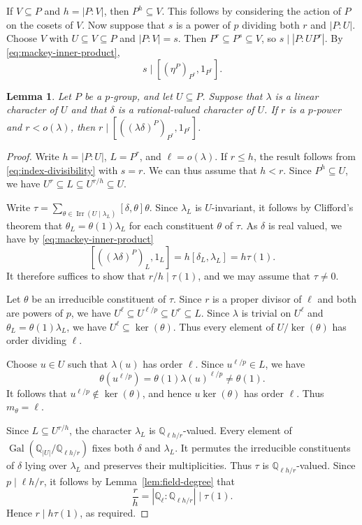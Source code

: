 \documentclass[reqno]{amsart}
\newtheorem{lem}[thm]{Lemma}
\theoremstyle{definition}
\theoremstyle{remark}
\numberwithin{equation}{section}
\DeclareMathOperator{\Irr}{Irr}
\DeclareMathOperator{\Gal}{Gal}
\theoremstyle{plain}
\begin{document}
If $V\subseteq P$ and $h=|P:V|$, then $P^h\subseteq V$.
This follows by considering the action of $P$ on the cosets of $V$.
Now suppose that $s$ is a power of $p$ dividing both $r$
and $|P:U|$.
Choose $V$ with $U\subseteq V\subseteq P$ and $|P:V|=s$.
Then $P^r\subseteq P^s\subseteq V$, so $s\mid|P:UP^r|$.
By \eqref{eq:mackey-inner-product},
\begin{equation}\label{eq:index-divisibility}
  s\mid[(\eta^P)_{P^r},1_{P^r}].
\end{equation}



\begin{lem}\label{lem:linear-rational}
Let $P$ be a $p$-group, and let $U\subseteq P$.
Suppose that $\lambda$ is a linear character of $U$ and that
$\delta$ is a rational-valued character of $U$.
If $r$ is a $p$-power and $r<o(\lambda)$, then
$r\mid[((\lambda\delta)^P)_{P^r},1_{P^r}]$.
\end{lem}

\begin{proof}
Write $h=|P:U|$, $L=P^r$, and $\ell=o(\lambda)$.
If $r\leq h$, the result follows from \eqref{eq:index-divisibility}
with $s=r$.
We can thus assume that $h<r$.
Since $P^h\subseteq U$, we have
$U^r\subseteq L\subseteq U^{r/h}\subseteq U$.

Write $\tau=\sum_{\theta\in\Irr(U\mid\lambda_L)}
[\delta,\theta]\theta$.
Since $\lambda_L$ is $U$-invariant, it follows by Clifford's
theorem that $\theta_L=\theta(1)\lambda_L$ for each
constituent $\theta$ of $\tau$.
As $\delta$ is real valued, we have by
\eqref{eq:mackey-inner-product}
\[
  [((\lambda\delta)^P)_L,1_L]
  =h[\delta_L,\lambda_L]=h\tau(1).
\]
It therefore suffices to show that $r/h\mid\tau(1)$,
and we may assume that $\tau\neq0$.

Let $\theta$ be an irreducible constituent of $\tau$.
Since $r$ is a proper divisor of $\ell$ and both are powers of $p$,
we have $U^\ell\subseteq U^{\ell/p}\subseteq U^r\subseteq L$.
Since $\lambda$ is trivial on $U^\ell$ and
$\theta_L=\theta(1)\lambda_L$, we have
$U^\ell\subseteq\ker(\theta)$.
Thus every element of $U/\ker(\theta)$ has order dividing $\ell$.

Choose $u\in U$ such that $\lambda(u)$ has order $\ell$.
Since $u^{\ell/p}\in L$, we have
\[
  \theta(u^{\ell/p})
  =\theta(1)\lambda(u)^{\ell/p}
  \neq\theta(1).
\]
It follows that $u^{\ell/p}\notin\ker(\theta)$, and hence
$u\ker(\theta)$ has order $\ell$.
Thus $m_\theta=\ell$.

Since $L\subseteq U^{r/h}$, the character $\lambda_L$ is
$\mathbb{Q}_{\ell h/r}$-valued.
Every element of
$\Gal(\mathbb{Q}_{|U|}/\mathbb{Q}_{\ell h/r})$
fixes both $\delta$ and $\lambda_L$.
It permutes the irreducible constituents of $\delta$
lying over $\lambda_L$ and preserves their multiplicities.
Thus $\tau$ is $\mathbb{Q}_{\ell h/r}$-valued.
Since $p\mid \ell h/r$, it follows by
Lemma~\ref{lem:field-degree} that
\[
  \frac{r}{h}
  =|\mathbb{Q}_\ell:\mathbb{Q}_{\ell h/r}|
  \mid\tau(1).
\]
Hence $r\mid h\tau(1)$, as required.
\end{proof}
\end{document}
